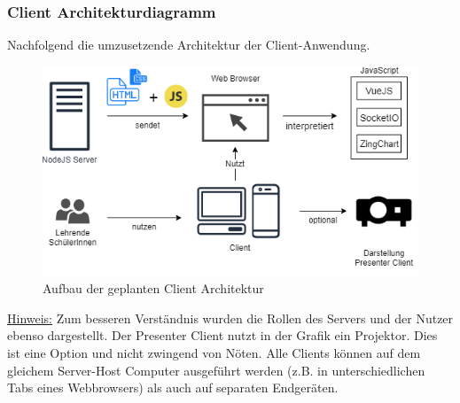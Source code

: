 \subsubsection{Client Architekturdiagramm}\label{sec:clientarchitekt}
Nachfolgend die umzusetzende Architektur der Client-Anwendung. 

\begin{figure}[H]
	\centering
	\includegraphics[width=0.8\linewidth]{bilder/client_architektur}
	\caption[Aufbau der geplanten Client Architektur]{Aufbau der geplanten Client Architektur}
	\label{fig:client_diagram}
\end{figure}
\footnotesize \underline{Hinweis:} Zum besseren Verständnis wurden die Rollen des Servers und der Nutzer ebenso dargestellt. Der Presenter Client nutzt in der Grafik ein Projektor. Dies ist eine Option und nicht zwingend von Nöten. Alle Clients können auf dem gleichem Server-Host Computer ausgeführt werden (z.B. in unterschiedlichen Tabs eines Webbrowsers) als auch auf separaten Endgeräten. 



\normalsize
